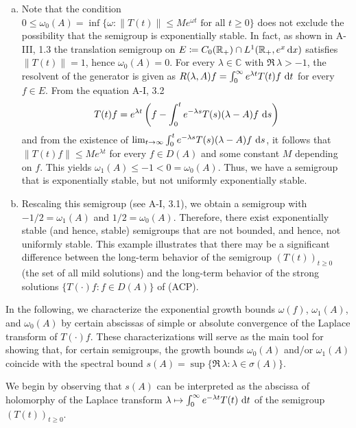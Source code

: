 \begin{example}
\begin{enumerate}[(a), wide]
\item 
Note that the condition $0 \leq \omega_0(A) = \inf\{\omega : \|T(t)\| \leq Me^{\omega t} \text{ for all } t \geq 0\}$ does not exclude the possibility that the semigroup is exponentially stable.
In fact, as shown in A-III, 1.3 the translation semigroup on $E \coloneqq C_0(\mathbb{R}_{+}) \cap L^{1}(\mathbb{R}_{+},e^{x}\mathop{}\!\mathrm{d}{x})$ satisfies $\|T(t)\| = 1$, hence $\omega_0(A) = 0$. 
For every $\lambda \in \mathbb{C}$ with $\Re\,\lambda > -1$, the resolvent of the generator is given as $R(\lambda,A)f = \int_{0}^{\infty} e^{\lambda t} T(t)f \,\mathop{}\!\mathrm{d}{t}$ for every $f \in E$.
From the equation A-I, 3.2
\[
T(t)f = e^{\lambda t}\left(f - \int_{0}^{t} e^{-\lambda s} T(s) (\lambda - A)f \,\mathop{}\!\mathrm{d}{s}\right)
\]
and from the existence of $\lim_{t \to \infty} \int_{0}^{t} e^{-\lambda s} T(s) (\lambda - A)f \,\mathop{}\!\mathrm{d}{s}$, it follows that 
$\|T(t)f\| \leq Me^{\lambda t}$ for every $f \in D(A)$ and some constant $M$ depending on $f$. This yields $\omega_{1}(A) \le -1 < 0 = \omega_0(A)$. 
Thus, we have a semigroup that is exponentially stable, but not uniformly exponentially stable.



\item
Rescaling this semigroup (see A-I, 3.1), we obtain a semigroup with $-1/2 = \omega_{1}(A)$ and $1/2 = \omega_0(A)$.
Therefore, there exist exponentially stable (and hence, stable) semigroups that are not bounded, and hence, not uniformly stable.
This example illustrates that there may be a significant difference between the long-term behavior of the semigroup $(T(t))_{t \geq 0}$ (\ie the set of all mild solutions) and the long-term behavior of the strong solutions $\{T(\cdot)f : f \in D(A)\}$ of (ACP). 
\end{enumerate}
\end{example}



In the following, we characterize the exponential growth bounds $\omega(f)$, $\omega_{1}(A)$, and $\omega_0(A)$ by certain abscissas of simple or absolute convergence of the Laplace transform of $T(\cdot)f$. 
These characterizations will serve as the main tool for showing that, for certain semigroups, the growth bounds $\omega_0(A)$ and/or $\omega_{1}(A)$ coincide with the spectral bound $s(A) = \sup\{\Re\,\lambda : \lambda \in \sigma(A)\}$.



We begin by observing that $s(A)$ can be interpreted as the abscissa of holomorphy of the Laplace transform $\lambda \mapsto \int_{0}^{\infty} e^{-\lambda t} T(t) \,\mathop{}\!\mathrm{d}{t}$ of the semigroup $(T(t))_{t \geq 0}$.

